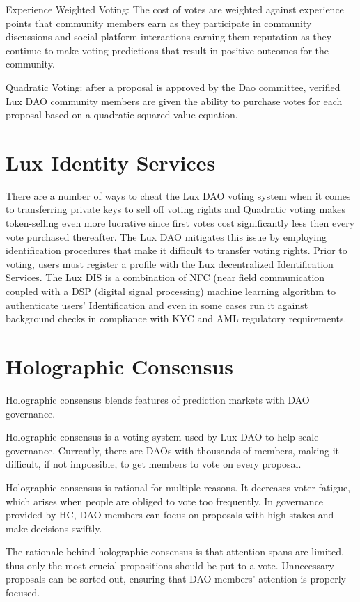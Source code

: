 \documentclass[11pt]{article}
\begin{document}
Experience Weighted Voting: The cost of votes are weighted against experience points that community members earn as they participate in community discussions and social platform interactions earning them reputation as they continue to make voting predictions that result in positive outcomes for the community.


Quadratic Voting:  after a proposal is approved by the Dao committee, verified  Lux DAO community members are given the ability to purchase votes for each proposal based on a quadratic squared value equation.


\section{Lux Identity Services}

There are a number of ways to cheat the Lux DAO voting system when it comes to transferring private keys to sell off voting rights and Quadratic voting makes token-selling even more lucrative since first votes cost significantly less then every vote purchased thereafter. The Lux DAO mitigates this issue by employing identification procedures that make it difficult to transfer voting rights. Prior to voting, users must register a profile with the Lux decentralized Identification Services. The Lux DIS is a combination of NFC (near field communication coupled with a DSP (digital signal processing) machine learning algorithm to authenticate users' Identification and even in some cases run it against background checks in compliance with KYC and AML regulatory requirements.


\section{Holographic Consensus}

Holographic consensus blends features of prediction markets with DAO governance.


Holographic consensus is a voting system used by Lux DAO to help scale governance. Currently, there are DAOs with thousands of members, making it difficult, if not impossible, to get members to vote on every proposal.


Holographic consensus is rational for multiple reasons. It decreases voter fatigue, which arises when people are obliged to vote too frequently. In governance provided by HC, DAO members can focus on proposals with high stakes and make decisions swiftly.


The rationale behind holographic consensus is that attention spans are limited, thus only the most crucial propositions should be put to a vote. Unnecessary proposals can be sorted out, ensuring that DAO members' attention is properly focused.
\end{document}
